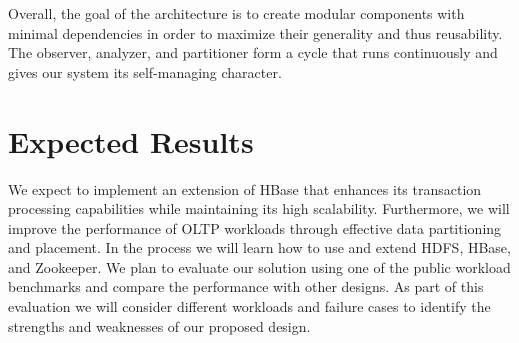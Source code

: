 \documentclass[10pt,final,journal]{IEEEtran}
\begin{document}
Overall, the goal of the architecture is to create modular components with minimal dependencies in order to maximize their generality and thus reusability. The observer, analyzer, and partitioner form a cycle that runs continuously and gives our system its self-managing character.

\section{Expected Results}
We expect to implement an extension of HBase that enhances its transaction processing capabilities while maintaining its high scalability. Furthermore, we will improve the performance of OLTP workloads through effective data partitioning and placement. In the process we will learn how to use and extend HDFS, HBase, and Zookeeper. We plan to evaluate our solution using one of the public workload benchmarks and compare the performance with other designs. As part of this evaluation we will consider different workloads and failure cases to identify the strengths and weaknesses of our proposed design.



\end{document}
